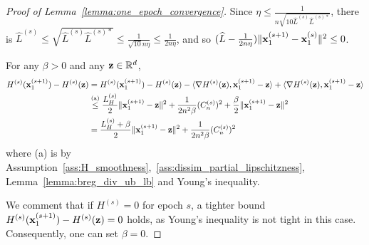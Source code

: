 \begin{proof}[Proof of Lemma~\ref{lemma:one_epoch_convergence}]
    Since $\eta \leq \frac{1}{n \sqrt{10 \widehat{L}^{(s)} \widehat{L}^{(s)*}}}$, there is $\widehat{L}^{(s)} \leq \sqrt{\widehat{L}^{(s)} \widehat{L}^{(s)*}} \leq \frac{1}{\sqrt{10} n \eta} \leq \frac{1}{2 n \eta}$, 
    and so $(\widehat{L} - \frac{1}{2n \eta})\|{\mathbf{x}}_1^{(s+1)} - {\mathbf{x}}_1^{(s)}\|^2 \leq 0$.

    For any $\beta > 0$ and any ${\mathbf{z}}\in\mathbb{R}^{d}$, 
    \begin{align}
        H^{(s)}({\mathbf{x}}_{1}^{(s+1)}) - H^{(s)}({\mathbf{z}})
        &= H^{(s)}({\mathbf{x}}_{1}^{(s+1)}) -  H^{(s)}({\mathbf{z}})
        - \langle \nabla H^{(s)}({\mathbf{z}}), {\mathbf{x}}_{1}^{(s+1)} - {\mathbf{z}}\rangle + \langle \nabla H^{(s)}({\mathbf{z}}), {\mathbf{x}}_{1}^{(s+1)} - {\mathbf{z}}\rangle\\
        &\stackrel{\text{(a)}}{\leq} \frac{L_H^{(s)}}{2}  \|{\mathbf{x}}_{1}^{(s+1)} - {\mathbf{z}}\|^2 + \frac{1}{2n^2 \beta}(C_n^{(s)})^2 + \frac{\beta}{2} \|{\mathbf{x}}_{1}^{(s+1)} - {\mathbf{z}}\|^2 \\
    \label{eq:dissim_ub}
        &= \frac{L_H^{(s)} + \beta}{2} \|{\mathbf{x}}_{1}^{(s+1)} - {\mathbf{z}}\|^2 + \frac{1}{2n^2 \beta}(C_n^{(s)})^2
    \end{align}
    where (a) is by Assumption~\ref{ass:H_smoothness},~\ref{ass:dissim_partial_lipschitzness}, Lemma~\ref{lemma:breg_div_ub_lb} and Young's inequality. 

    We comment 
    that if $H^{(s)} = 0$ for epoch $s$, a tighter bound $H^{(s)}({\mathbf{x}}_1^{(s+1)}) - H^{(s)}({\mathbf{z}}) = 0$ holds, as Young's inequality is not tight in this case. Consequently, one can set $\beta = 0$. 


\end{proof}
